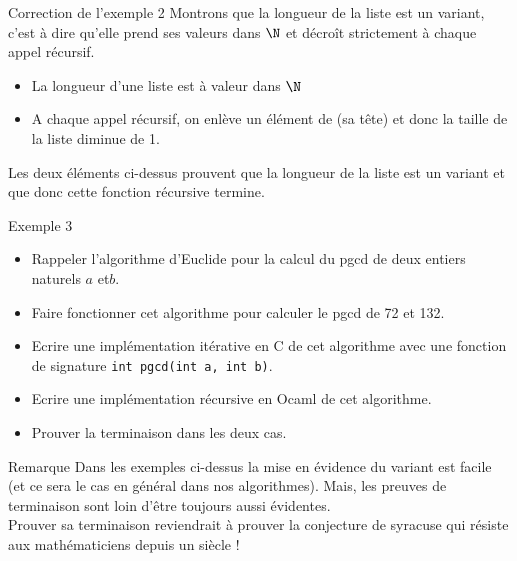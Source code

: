 \documentclass[10pt]{beamer}
\begin{document}
    \begin{frame}[fragile]{\Ctitle}{\stitle}
    \begin{exampleblock}{Correction de l'exemple 2}
        \textcolor{OliveGreen}{Montrons que la longueur de la liste  est un variant, c'est à dire qu'elle prend ses valeurs dans $\N$ et  décroît strictement à chaque appel récursif.}
        \begin{itemize}
            \item<2->{\textcolor{OliveGreen}{La longueur d'une liste est à valeur dans $\N$}}
            \item<3->{\textcolor{OliveGreen}{A chaque appel récursif, on enlève un élément de  (sa tête) et donc la taille de la liste diminue de 1.}}
        \end{itemize}
        \textcolor{OliveGreen}{Les deux éléments ci-dessus prouvent que la longueur de la liste est un variant et que donc cette fonction récursive termine.}
    \end{exampleblock}
    \end{frame}

    \begin{frame}[fragile]{\Ctitle}{\stitle}
        \begin{exampleblock}{Exemple 3}
            \begin{itemize}
                \item<1-> Rappeler l'algorithme d'Euclide pour la calcul du {\sc pgcd} de deux entiers naturels $a$ et$b$.
                \item<2-> Faire fonctionner cet algorithme pour calculer le {\sc pgcd} de 72 et 132.
                \item<3-> Ecrire une implémentation itérative en C de cet algorithme avec une fonction de signature \texttt{int pgcd(int a, int b)}.
                \item<4-> Ecrire une implémentation récursive en Ocaml de cet algorithme.
                \item<5-> Prouver la terminaison dans les deux cas.
            \end{itemize}
        \end{exampleblock}
        \end{frame}

    \begin{frame}[fragile]{\Ctitle}{\stitle}
        \begin{block}{Remarque}
            Dans les exemples ci-dessus la mise en évidence du variant est facile (et ce sera le cas en général dans nos algorithmes). Mais, les preuves de terminaison sont loin d'être toujours aussi évidentes.\\
             Prouver sa terminaison reviendrait à prouver la conjecture de syracuse qui résiste aux mathématiciens depuis un siècle !
        \end{block}
    \end{frame}
\end{document}

